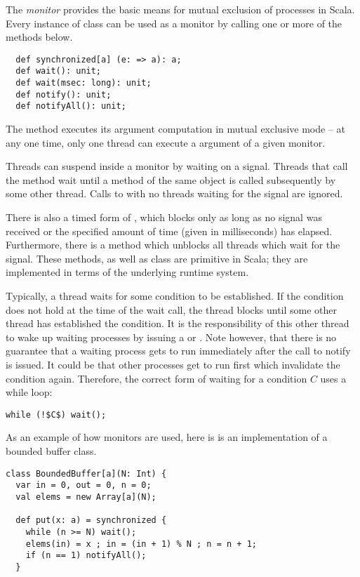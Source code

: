 {\example
The {\em monitor} provides the basic means for mutual exclusion
of processes in Scala. Every instance of class  can be
used as a monitor by calling one or more of the methods below.
\begin{lstlisting}
  def synchronized[a] (e: => a): a;
  def wait(): unit;
  def wait(msec: long): unit;
  def notify(): unit;
  def notifyAll(): unit;
\end{lstlisting}
The  method executes its argument computation
 in mutual exclusive mode -- at any one time, only one thread
can execute a  argument of a given monitor.

Threads can suspend inside a monitor by waiting on a signal.  Threads
that call the  method wait until a  method of
the same object is called subsequently by some other thread. Calls to
 with no threads waiting for the signal are ignored.

There is also a timed form of , which blocks only as long
as no signal was received or the specified amount of time (given in
milliseconds) has elapsed. Furthermore, there is a 
method which unblocks all threads which wait for the signal.  These
methods, as well as class  are primitive in Scala; they
are implemented in terms of the underlying runtime system.

Typically, a thread waits for some condition to be established. If the
condition does not hold at the time of the wait call, the thread
blocks until some other thread has established the condition. It is
the responsibility of this other thread to wake up waiting processes
by issuing a  or . Note however, that
there is no guarantee that a waiting process gets to run immediately
after the call to notify is issued. It could be that other processes
get to run first which invalidate the condition again. Therefore, the
correct form of waiting for a condition $C$ uses a while loop:
\begin{lstlisting}
while (!$C$) wait();
\end{lstlisting}

As an example of how monitors are used, here is is an implementation
of a bounded buffer class.
\begin{lstlisting}
class BoundedBuffer[a](N: Int) {
  var in = 0, out = 0, n = 0;
  val elems = new Array[a](N);

  def put(x: a) = synchronized {
    while (n >= N) wait();
    elems(in) = x ; in = (in + 1) % N ; n = n + 1;
    if (n == 1) notifyAll();
  }


\end{lstlisting}}
